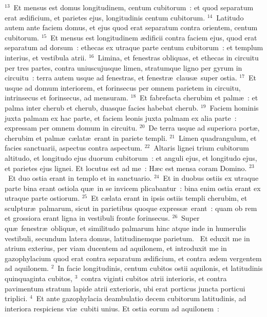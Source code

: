 ${}^{13}$~Et mensus est domus longitudinem, centum cubitorum~: et quod separatum erat \ae dificium, et parietes ejus, longitudinis centum cubitorum.
${}^{14}$~Latitudo autem ante faciem domus, et ejus quod erat separatum contra orientem, centum cubitorum.
${}^{15}$~Et mensus est longitudinem \ae dificii contra faciem ejus, quod erat separatum ad dorsum~: ethecas ex utraque parte centum cubitorum~: et templum interius, et vestibula atrii.
${}^{16}$~Limina, et fenestras obliquas, et ethecas in circuitu per tres partes, contra uniuscujusque limen, stratumque ligno per gyrum in circuitu~: terra autem usque ad fenestras, et fenestr\ae\ claus\ae\ super ostia.
${}^{17}$~Et usque ad domum interiorem, et forinsecus per omnem parietem in circuitu, intrinsecus et forinsecus, ad mensuram.
${}^{18}$~Et fabrefacta cherubim et palm\ae~: et palma inter cherub et cherub, duasque facies habebat cherub.
${}^{19}$~Faciem hominis juxta palmam ex hac parte, et faciem leonis juxta palmam ex alia parte~: expressam per omnem domum in circuitu.
${}^{20}$~De terra usque ad superiora port\ae , cherubim et palm\ae\ c\ae lat\ae\ erant in pariete templi.
${}^{21}$~Limen quadrangulum, et facies sanctuarii, aspectus contra aspectum.
${}^{22}$~Altaris lignei trium cubitorum altitudo, et longitudo ejus duorum cubitorum~: et anguli ejus, et longitudo ejus, et parietes ejus lignei. Et locutus est ad me~: H\ae c est mensa coram Domino.
${}^{23}$~Et duo ostia erant in templo et in sanctuario.
${}^{24}$~Et in duobus ostiis ex utraque parte bina erant ostiola qu\ae\ in se invicem plicabantur~: bina enim ostia erant ex utraque parte ostiorum.
${}^{25}$~Et c\ae lata erant in ipsis ostiis templi cherubim, et sculptur\ae\ palmarum, sicut in parietibus quoque express\ae\ erant~: quam ob rem et grossiora erant ligna in vestibuli fronte forinsecus.
${}^{26}$~Super qu\ae\ fenestr\ae\ obliqu\ae , et similitudo palmarum hinc atque inde in humerulis vestibuli, secundum latera domus, latitudinemque parietum.
~Et eduxit me in atrium exterius, per viam ducentem ad aquilonem, et introduxit me in gazophylacium quod erat contra separatum \ae dificium, et contra \ae dem vergentem ad aquilonem.
${}^{2}$~In facie longitudinis, centum cubitos ostii aquilonis, et latitudinis quinquaginta cubitos,
${}^{3}$~contra viginti cubitos atrii interioris, et contra pavimentum stratum lapide atrii exterioris, ubi erat porticus juncta porticui triplici.
${}^{4}$~Et ante gazophylacia deambulatio decem cubitorum latitudinis, ad interiora respiciens vi\ae\ cubiti unius. Et ostia eorum ad aquilonem~:
